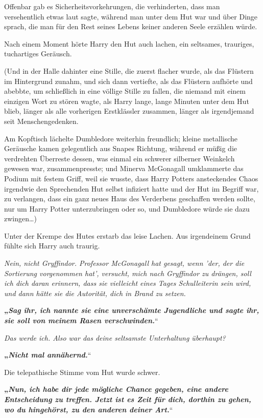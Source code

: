 {Offenbar gab es Sicherheitsvorkehrungen, die verhinderten, dass man versehentlich etwas laut sagte, während man unter dem Hut war und über Dinge sprach, die man für den Rest seines Lebens keiner anderen Seele erzählen würde.

Nach einem Moment hörte Harry den Hut auch lachen, ein seltsames, trauriges, tuchartiges Geräusch.

(Und in der Halle dahinter eine Stille, die zuerst flacher wurde, als das Flüstern im Hintergrund zunahm, und sich dann vertiefte, als das Flüstern aufhörte und abebbte, um schließlich in eine völlige Stille zu fallen, die niemand mit einem einzigen Wort zu stören wagte, als Harry lange, lange Minuten unter dem Hut blieb, länger als alle vorherigen Erstklässler zusammen, länger als irgendjemand seit Menschengedenken.

Am Kopftisch lächelte Dumbledore weiterhin freundlich; kleine metallische Geräusche kamen gelegentlich aus Snapes Richtung, während er müßig die verdrehten Überreste dessen, was einmal ein schwerer silberner Weinkelch gewesen war, zusammenpresste; und Minerva McGonagall umklammerte das Podium mit festem Griff, weil sie wusste, dass Harry Potters ansteckendes Chaos irgendwie den Sprechenden Hut selbst infiziert hatte und der Hut im Begriff war, zu verlangen, dass ein ganz neues Haus des Verderbens geschaffen werden sollte, nur um Harry Potter unterzubringen oder so, und Dumbledore würde sie dazu zwingen…)

Unter der Krempe des Hutes erstarb das leise Lachen. Aus irgendeinem Grund fühlte sich Harry auch traurig.

\emph{Nein, nicht Gryffindor. Professor McGonagall hat gesagt, wenn 'der, der die Sortierung vorgenommen hat', versucht, mich nach Gryffindor zu drängen, soll ich dich daran erinnern, dass sie vielleicht eines Tages Schulleiterin sein wird, und dann hätte sie die Autorität, dich in Brand zu setzen.}

\textbf{„\emph{Sag ihr, ich nannte sie eine unverschämte Jugendliche und sagte ihr, sie soll von meinem Rasen verschwinden.}}“

\emph{Das werde ich. Also war das deine seltsamste Unterhaltung überhaupt?}

\textbf{„\emph{Nicht mal annähernd.}}“

Die telepathische Stimme vom Hut wurde schwer.

\textbf{„\emph{Nun, ich habe dir jede mögliche Chance gegeben, eine andere Entscheidung zu treffen. Jetzt ist es Zeit für dich, dorthin zu gehen, wo du hingehörst, zu den anderen deiner Art.}}“

}
